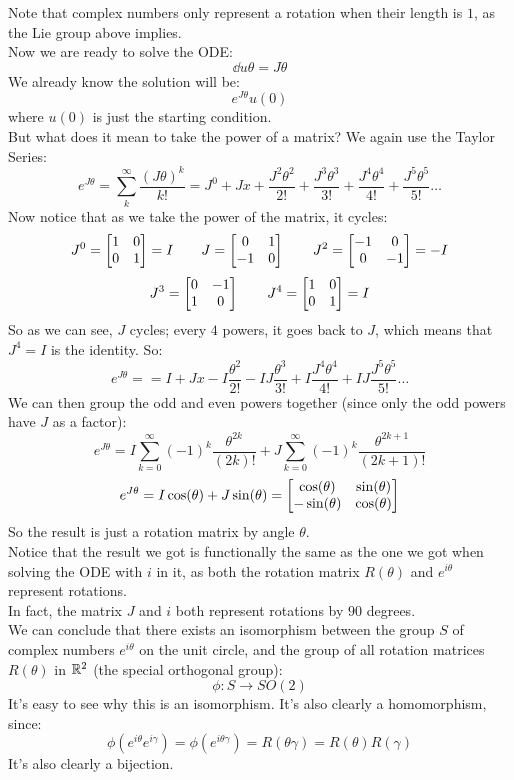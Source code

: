 \documentclass[12pt]{article}
\begin{document}
Note that complex numbers only represent a
rotation when their length is $1$,
as the Lie group above implies. \\

Now we are ready to solve the ODE:
\[ \dd{u}{\theta} = J\theta \]
We already know the solution will be:
\[ e^{J\theta}u(0) \]
where $u(0)$ is just the starting condition. \\
But what does it mean to take the power of a
matrix? 
We again use the Taylor Series:
\[ e^{J\theta} = \sum_{k}^{\infty} 
\dfrac{(J\theta)^k}{k!} 
= J^0 + Jx + \dfrac{J^2\theta^2}{2!}
+ \dfrac{J^3\theta^3}{3!} + \dfrac{J^4\theta^4}{4!}
+ \dfrac{J^5\theta^5}{5!} \dots \]
Now notice that as we take the power of the
matrix, it cycles:
\[ J^0 = \begin{bmatrix} 1 & 0 \\ 0 & 1 \end{bmatrix} = I \qquad
J = \begin{bmatrix} 0 & 1 \\ -1 & 0 \end{bmatrix}
\qquad J^2 = \begin{bmatrix} -1 & 0 \\ 0 & -1 \end{bmatrix} = -I \]
\[ J^3 = \begin{bmatrix} 0 & -1 \\ 1 & 0 \end{bmatrix}
\qquad J^4 = \begin{bmatrix} 1 & 0 \\ 0 & 1 \end{bmatrix} = I \]
So as we can see, $J$ cycles;
every $4$ powers, it goes back to $J$,
which means that $J^4 = I$ is the identity.
So:
\[ e^{J\theta} =
= I + Jx -I\dfrac{\theta^2}{2!}
- IJ\dfrac{\theta^3}{3!} + I\dfrac{J^4\theta^4}{4!}
+ IJ\dfrac{J^5\theta^5}{5!} \dots \]
We can then group the odd and even powers
together (since only the odd powers have $J$
as a factor):
\[ e^{J\theta}
= I\sum_{k = 0}^{\infty} 
(-1)^{k} \dfrac{\theta^{2k}}{(2k)!}
+ J\sum_{k = 0}^{\infty} (-1)^{k}
\dfrac{\theta^{2k + 1}}{(2k + 1)!} \]
\[ e^{J\theta} = I\cos(\theta) + J\sin(\theta)
= \begin{bmatrix} \cos(\theta) & \sin(\theta) \\ -\sin(\theta) & \cos(\theta) \end{bmatrix} \]
So the result is just a rotation matrix
by angle $\theta$. \\

Notice that the result we got is functionally
the same as the one we got when solving the
ODE with $i$ in it,
as both the rotation matrix $R(\theta)$
and $e^{i\theta}$ represent rotations. \\
In fact, the matrix $J$ and $i$
both represent rotations by $90$ degrees. \\

We can conclude that there exists
an isomorphism between the group $S$
of complex numbers $e^{i\theta}$
on the unit circle, and the group of
all rotation matrices $R(\theta)$
in $\mathbb{R}^2$ (the special orthogonal group):
\[ \phi: S \to SO(2) \]
It's easy to see why this is an isomorphism.
It's also clearly a homomorphism,
since:
\[ \phi(e^{i\theta}e^{i\gamma})
= \phi(e^{i\theta \gamma})
= R(\theta \gamma) = R(\theta)R(\gamma) \]
It's also clearly a bijection. \\
\end{document}
